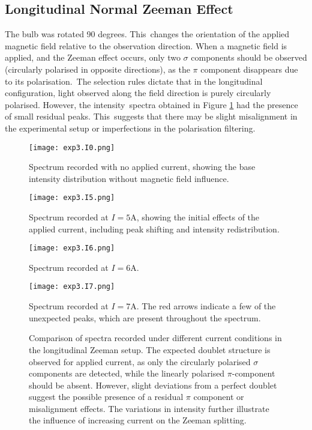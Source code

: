 \documentclass[11pt,twocolumn, a4paper]{article}
\numberwithin{equation}{section} %
\numberwithin{figure}{section} %
\numberwithin{table}{section} %
\begin{document}
\subsection{Longitudinal Normal Zeeman Effect}
The bulb was rotated 90 degrees. This changes the orientation of the applied magnetic field relative to the observation direction. When a magnetic field is applied, and the Zeeman effect occurs, only two $\sigma$ components should be observed (circularly polarised in opposite directions), as the $\pi$ component disappears due to its polarisation. The selection rules dictate that in the longitudinal configuration, light observed along the field direction is purely circularly polarised.  However,  the intensity spectra obtained in Figure \ref{fig:four_spectra_grid} had the presence of small residual peaks. This suggests that there may be slight misalignment in the experimental setup or imperfections in the polarisation filtering. 
\begin{figure}[H]
    \centering
    \begin{minipage}{0.48\textwidth}
        \centering
        \texttt{[image: exp3.I0.png]}
        \caption{Spectrum recorded with no applied current, showing the base intensity distribution without magnetic field influence.}
        \label{fig:exp3spectrum1}
    \end{minipage}
    \hfill
    \begin{minipage}{0.48\textwidth}
        \centering
        \texttt{[image: exp3.I5.png]}
        \caption{Spectrum recorded at \(I=5\)A, showing the initial effects of the applied current, including peak shifting and intensity redistribution.}
        \label{fig:exp3spectrum2}
    \end{minipage}
    
    \vspace{0.5cm} %
    
    \begin{minipage}{0.48\textwidth}
        \centering
        \texttt{[image: exp3.I6.png]}
        \caption{Spectrum recorded at \(I=6\)A.}
        \label{fig:exp3spectrum3}
    \end{minipage}
    \hfill
    \begin{minipage}{0.48\textwidth}
        \centering
        \texttt{[image: exp3.I7.png]}
        \caption{Spectrum recorded at \(I=7\)A. The red arrows indicate a few of the unexpected peaks, which are present throughout the spectrum. }
        \label{fig:exp3spectrum4}
    \end{minipage}
    \caption{ Comparison of spectra recorded under different current conditions in the longitudinal Zeeman setup. The expected doublet structure is observed for applied current, as only the circularly polarised \(\sigma\) components are detected, while the linearly polarised \(\pi\)-component should be absent. However, slight deviations from a perfect doublet suggest the possible presence of a residual \(\pi\) component or misalignment effects. The variations in intensity further illustrate the influence of increasing current on the Zeeman splitting.}
    \label{fig:four_spectra_grid}
\end{figure}
\end{document}
